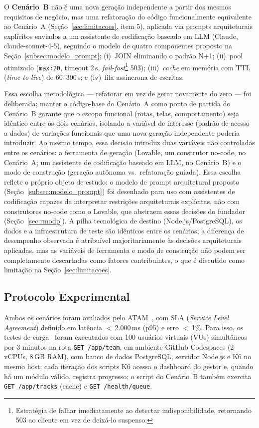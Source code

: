 \documentclass[sigconf]{acmart}
\begin{document}
O \textbf{Cenário~B} não é uma nova geração independente a partir dos mesmos requisitos
de negócio, mas uma refatoração do código funcionalmente equivalente ao Cenário~A
(Seção~\ref{sec:limitacoes}, item 5), aplicada via prompts arquiteturais explícitos
enviados a um assistente de codificação baseado em LLM (Claude, claude-sonnet-4-5),
seguindo o modelo de quatro componentes proposto na Seção~\ref{subsec:modelo_prompt}:
(i)~JOIN eliminando o padrão N+1; (ii)~pool otimizado (\texttt{max:20}, timeout 2\,s,
\textit{fail-fast}\footnote{Estratégia de falhar imediatamente ao detectar indisponibilidade, retornando 503 ao cliente em vez de deixá-lo suspenso.} 503); (iii)~\textit{cache} em memória com TTL
(\textit{time-to-live}) de 60--300\,s; e (iv)~fila assíncrona de escritas.

Essa escolha metodológica — refatorar em vez de gerar novamente do zero — foi
deliberada: manter o código-base do Cenário~A como ponto de partida do Cenário~B
garante que o escopo funcional (rotas, telas, comportamento) seja idêntico entre os
dois cenários, isolando a variável de interesse (padrão de acesso a dados) de
variações funcionais que uma nova geração independente poderia introduzir. Ao mesmo
tempo, essa decisão introduz duas variáveis não controladas entre os cenários: a
ferramenta de geração (Lovable, um construtor no-code, no Cenário~A; um assistente
de codificação baseado em LLM, no Cenário~B) e o modo de construção (geração autônoma
vs.\ refatoração guiada). Essa escolha reflete o próprio objeto de estudo: o modelo de
prompt arquitetural proposto (Seção~\ref{subsec:modelo_prompt}) foi desenhado para uso
com assistentes de codificação capazes de interpretar restrições arquiteturais
explícitas, não com construtores no-code como o Lovable, que abstraem essas decisões
do fundador (Seção~\ref{sec:rmodp}). A pilha tecnológica de destino
(Node.js/PostgreSQL), os dados e a infraestrutura de teste são idênticos entre os
cenários; a diferença de desempenho observada é atribuível majoritariamente às decisões
arquiteturais aplicadas, mas as variáveis de ferramenta e modo de construção não podem
ser completamente descartadas como fatores contribuintes, o que é discutido como
limitação na Seção~\ref{sec:limitacoes}.

\subsection{Protocolo Experimental}

Ambos os cenários foram avaliados pelo ATAM~\cite{Kazman2000}, com SLA (\textit{Service Level Agreement}) definido em latência $<$\,2.000\,ms (p95) e erro $<$\,1\%. Para isso, os testes de carga~\cite{grafana2024} foram executados com 100 usuários virtuais (VUs) simultâneos por 3 minutos na rota \texttt{GET /app/team}, em ambiente GitHub Codespaces (2\,vCPUs, 8\,GB RAM), com banco de dados PostgreSQL, servidor Node.js e K6 no mesmo host; cada iteração dos scripts K6 acessa o dashboard do gestor e, quando há um módulo válido, registra progresso; o script do Cenário~B também exercita \texttt{GET /app/tracks} (cache) e \texttt{GET /health/queue}.
\end{document}
